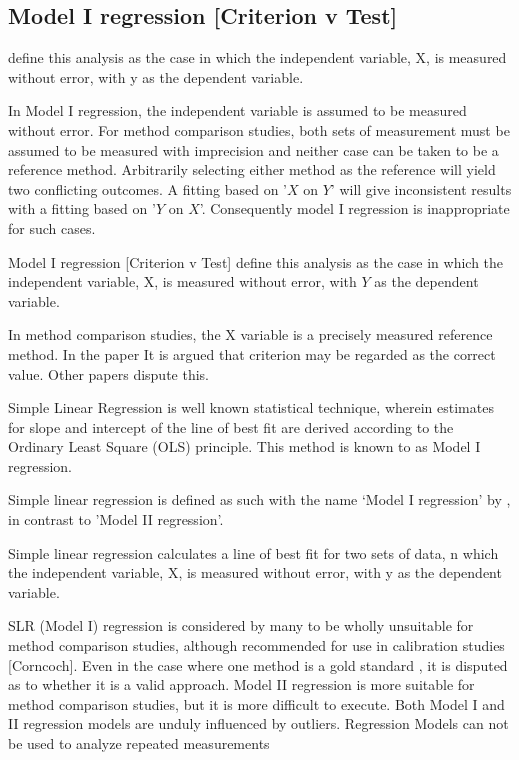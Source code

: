 \documentclass[12pt, a4paper]{report}
\theoremstyle{plain}
\theoremstyle{definition}
\theoremstyle{remark}
\begin{document}
\subsection{Model I regression [Criterion v Test]}
\citet{CornCoch} define this analysis as the case in which the independent variable, X, is measured without error, with y as the dependent variable.
 

In Model I regression, the independent variable is assumed to be
measured without error. For method comparison studies, both sets of measurement must be assumed to be measured with imprecision and neither case can be taken to be a reference method. Arbitrarily
selecting either method as the reference will yield two conflicting outcomes. A fitting based on '$X$ on $Y$' will give inconsistent results with a fitting based on '$Y$ on $X$'. Consequently model I regression is inappropriate for such cases.

Model I regression [Criterion v Test] \citet{CornCoch} define this analysis as the case in which the independent variable, X, is measured without error, with $Y$ as the dependent
variable.

In method comparison studies, the X variable is a precisely measured reference method. In the \citet{CornCoch} paper It is argued that criterion may be regarded as the correct value.
Other papers dispute this.

Simple Linear Regression is well known statistical technique, wherein estimates for slope and
intercept of the line of best fit are derived according to the Ordinary Least Square (OLS) principle. This method is known to \citet{CornCoch} as Model I regression.

Simple linear regression is defined as such with the name `Model I regression' by \citet{CornCoch}, in contrast to 'Model II regression'.

Simple linear regression calculates a line of best fit for two
sets of data, n which the independent variable, X, is measured without error, with y as the dependent variable.  

SLR (Model I) regression is considered by many \citet{BA83,CornCoch,ludbrook97} to be wholly unsuitable for
method comparison studies, although recommended for use in calibration studies [Corncoch]. Even in the case where one
method is a gold standard , it is disputed as to whether it is a valid approach. Model II regression is more suitable for method comparison studies, but it is more difficult to execute. Both Model I and II regression models are unduly influenced by outliers. Regression Models can not be used to analyze repeated measurements
\end{document}
